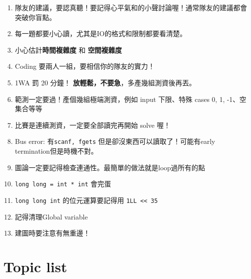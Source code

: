 \documentclass[10pt,oneside]{article}
\begin{document}
\begin{landscape}
\begin{multicols}{2}
			{\large
				\begin{enumerate}
					\item 隊友的建議，要認真聽！要記得心平氣和的小聲討論喔！通常隊友的建議都會突破你盲點。
					\item 每一題都要小心讀，尤其是IO的格式和限制都要看清楚。%
					\item 小心估計\textbf{時間複雜度} 和 \textbf{空間複雜度}%
					\item Coding 要兩人一組，要相信你的隊友的實力！
					\item 1WA 罰 20 分鐘！ \textbf{放輕鬆，不要急}，多產幾組測資後再丟。%
					\item 範測一定要過！產個幾組極端測資，例如 input 下限、特殊 cases 0, 1, -1、空集合等等 %
					\item 比賽是連續測資，一定要全部讀完再開始 solve 喔！%
					\item Bus error: 有\texttt{scanf, fgets} 但是卻沒東西可以讀取了！可能有early termination但是時機不對。 %
					\item 圖論一定要記得檢查連通性。最簡單的做法就是loop過所有的點%
					\item \texttt{long long = int * int} 會完蛋%
					\item \texttt{long long int} 的位元運算要記得用 \texttt{1LL << 35} %
					\item 記得清理Global variable
					\item 建圖時要注意有無重邊！
				\end{enumerate}
			}
			
			\section{Topic list}
			

\end{multicols}
\end{landscape}
\end{document}
